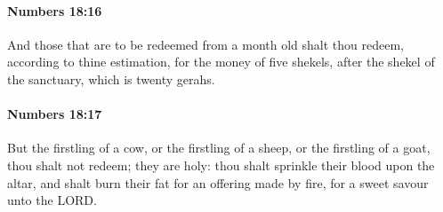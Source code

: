 		\paragraph{Numbers 18:16} %
			\label{NUMBERS-18-16}

			And those that are to be redeemed from a month old shalt thou redeem, according to thine estimation, for the money of five shekels, after the shekel of the sanctuary, which is twenty gerahs.


		\paragraph{Numbers 18:17} %
			\label{NUMBERS-18-17}

			But the firstling of a cow, or the firstling of a sheep, or the firstling of a goat, thou shalt not redeem; they are holy: thou shalt sprinkle their blood upon the altar, and shalt burn their fat for an offering made by fire, for a sweet savour unto the LORD.

